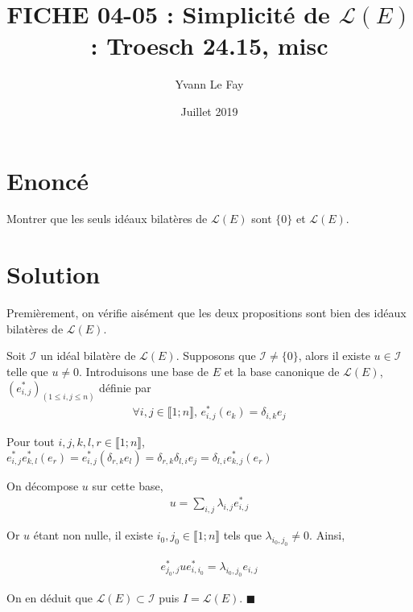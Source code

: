 \documentclass{article}
\newcommand*{\QED}{\hfill\ensuremath{\blacksquare}}%
\begin{document}
\title{FICHE 04-05 : Simplicité de $\mathcal{L}(E)$ : Troesch 24.15, misc}
\author{Yvann Le Fay}
\date{Juillet 2019}
\maketitle
\section*{Enoncé}
Montrer que les seuls idéaux bilatères de $\mathcal{L}(E)$ sont $\{0\}$ et $\mathcal{L}(E)$.
\section*{Solution}
Premièrement, on vérifie aisément que les deux propositions sont bien des idéaux bilatères de $\mathcal{L}(E)$. 

Soit $\mathcal{I}$ un idéal bilatère de $\mathcal{L}(E)$. Supposons que $\mathcal{I}\neq \{0\}$, alors il existe $u\in\mathcal{I}$ telle que $u\neq 0$. Introduisons une base de $E$ et la base canonique de $\mathcal{L}(E)$, $(e^*_{i,j})_{(1\leq i,j\leq n)}$ définie par 
\begin{align*}
\forall i,j\in\llbracket 1;n\rrbracket,\, e^*_{i,j}(e_k) = \delta_{i,k}e_j
\end{align*}

Pour tout $i,j,k,l, r \in \llbracket 1;n\rrbracket$, $e^*_{i,j}e^*_{k,l}(e_r) = e^*_{i,j}(\delta_{r,k}e_l) = \delta_{r,k} \delta_{l,i}e_j = \delta_{l,i}e^*_{k,j}(e_r)$

On décompose $u$ sur cette base, 
\begin{align*}
u = \sum_{i,j}\lambda_{i,j} e^*_{i,j}
\end{align*}

Or $u$ étant non nulle, il existe $i_0, j_0 \in\llbracket 1;n\rrbracket$ tels que $\lambda_{i_0,j_0}\neq 0$. Ainsi,

\begin{align*}
e^*_{j_0,j}ue^*_{i,i_0} = \lambda_{i_0,j_0}e_{i,j}
\end{align*}

On en déduit que $\mathcal{L}(E)\subset \mathcal{I}$ puis $I=\mathcal{L}(E)$.
\QED
\end{document}
